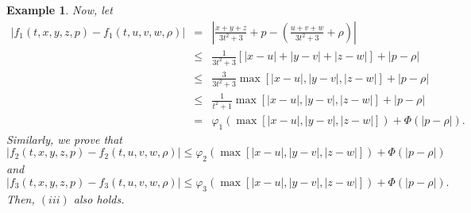 \documentclass{amsart}
\theoremstyle{plain}
\newtheorem{example}{Example}
\numberwithin{equation}{section}
\begin{document}
\begin{example}
Now, let\begin{eqnarray*}
\left\vert f_{1}\left( t,x,y,z,p\right) -f_{1}\left( t,u,v,w,\rho \right)
\right\vert &=&\left\vert \frac{x+y+z}{3t^{2}+3}+p-\left( \frac{u+v+w}{3t^{2}+3}+\rho \right) \right\vert \\
&\leqslant &\frac{1}{3t^{2}+3}\left[ \left\vert x-u\right\vert +\left\vert
y-v\right\vert +\left\vert z-w\right\vert \right] +\left\vert p-\rho
\right\vert \\
&\leqslant &\frac{3}{3t^{2}+3}\max \left[ \left\vert x-u\right\vert
,\left\vert y-v\right\vert ,\left\vert z-w\right\vert \right] +\left\vert
p-\rho \right\vert \\
&\leqslant &\frac{1}{t^{2}+1}\max \left[ \left\vert x-u\right\vert
,\left\vert y-v\right\vert ,\left\vert z-w\right\vert \right] +\left\vert
p-\rho \right\vert \\
&=&\varphi _{1}\left( \max \left[ \left\vert x-u\right\vert ,\left\vert
y-v\right\vert ,\left\vert z-w\right\vert \right] \right) +\Phi \left(
\left\vert p-\rho \right\vert \right) .
\end{eqnarray*}Similarly, we prove that\begin{equation*}
\left\vert f_{2}\left( t,x,y,z,p\right) -f_{2}\left( t,u,v,w,\rho \right)
\right\vert \leqslant \varphi _{2}\left( \max \left[ \left\vert
x-u\right\vert ,\left\vert y-v\right\vert ,\left\vert z-w\right\vert \right]
\right) +\Phi \left( \left\vert p-\rho \right\vert \right)
\end{equation*}and\begin{equation*}
\left\vert f_{3}\left( t,x,y,z,p\right) -f_{3}\left( t,u,v,w,\rho \right)
\right\vert \leqslant \varphi _{3}\left( \max \left[ \left\vert
x-u\right\vert ,\left\vert y-v\right\vert ,\left\vert z-w\right\vert \right]
\right) +\Phi \left( \left\vert p-\rho \right\vert \right) .
\end{equation*}Then, $\left( iii\right) $ also holds.


\end{example}
\end{document}
